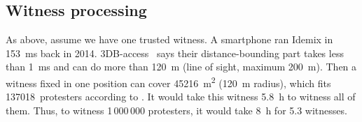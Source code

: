 

\subsection{Witness processing}

As above, assume we have one trusted witness.
A smartphone ran Idemix in \SI{153}{\milli\second} back in 2014.
3DB-access~\cite{3db-access} says their distance-bounding part takes less than 
\SI{1}{\milli\second} and can do more than \SI{120}{\metre} (line of sight, 
maximum \SI{200}{\metre}).
Then a witness fixed in one position can cover \SI{45216}{\square\metre} 
(\SI{120}{\metre} radius), which fits 137018~protesters according to 
\textcite{2016DemonstrationsInSeoul}.
It would take this witness \SI{5.8}{\hour} to witness all of them.
Thus, to witness 1\,000\,000 protesters, it would take \SI{8}{\hour} for 5.3 
witnesses.

